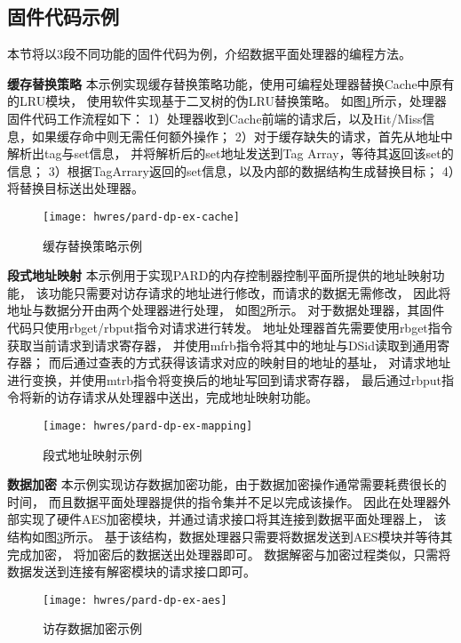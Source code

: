 \subsection{固件代码示例}
本节将以3段不同功能的固件代码为例，介绍数据平面处理器的编程方法。

\textbf{缓存替换策略}\quad
本示例实现缓存替换策略功能，使用可编程处理器替换Cache中原有的LRU模块，
使用软件实现基于二叉树的伪LRU替换策略。
如图\ref{fig:pard-dp-ex-cache}所示，处理器固件代码工作流程如下：
1）处理器收到Cache前端的请求后，以及Hit/Miss信息，如果缓存命中则无需任何额外操作；
2）对于缓存缺失的请求，首先从地址中解析出tag与set信息，
并将解析后的set地址发送到Tag Array，等待其返回该set的信息；
3）根据TagArrary返回的set信息，以及内部的数据结构生成替换目标；
4）将替换目标送出处理器。

\begin{figure}[H]
  \centering
  \texttt{[image: hwres/pard-dp-ex-cache]}
  \caption{缓存替换策略示例}
  \label{fig:pard-dp-ex-cache}
\end{figure}


\textbf{段式地址映射}\quad
本示例用于实现PARD的内存控制器控制平面所提供的地址映射功能，
该功能只需要对访存请求的地址进行修改，而请求的数据无需修改，
因此将地址与数据分开由两个处理器进行处理，
如图\ref{fig:pard-dp-ex-mapping}所示。
对于数据处理器，其固件代码只使用rbget/rbput指令对请求进行转发。
地址处理器首先需要使用rbget指令获取当前请求到请求寄存器，
并使用mfrb指令将其中的地址与DSid读取到通用寄存器；
而后通过查表的方式获得该请求对应的映射目的地址的基址，
对请求地址进行变换，并使用mtrb指令将变换后的地址写回到请求寄存器，
最后通过rbput指令将新的访存请求从处理器中送出，完成地址映射功能。

\begin{figure}[H]
  \centering
  \texttt{[image: hwres/pard-dp-ex-mapping]}
  \caption{段式地址映射示例}
  \label{fig:pard-dp-ex-mapping}
\end{figure}
 
\textbf{数据加密}\quad
本示例实现访存数据加密功能，由于数据加密操作通常需要耗费很长的时间，
而且数据平面处理器提供的指令集并不足以完成该操作。
因此在处理器外部实现了硬件AES加密模块，并通过请求接口将其连接到数据平面处理器上，
该结构如图\ref{fig:pard-dp-ex-aes}所示。
基于该结构，数据处理器只需要将数据发送到AES模块并等待其完成加密，
将加密后的数据送出处理器即可。
数据解密与加密过程类似，只需将数据发送到连接有解密模块的请求接口即可。

\begin{figure}[H]
  \centering
  \texttt{[image: hwres/pard-dp-ex-aes]}
  \caption{访存数据加密示例}
  \label{fig:pard-dp-ex-aes}
\end{figure}
 


